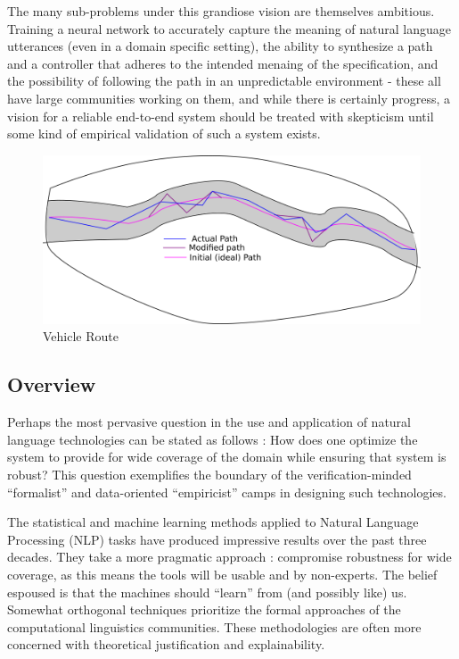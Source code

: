 \documentclass{article}
\begin{document}
The many sub-problems under this grandiose vision are themselves ambitious.
Training a neural network to accurately capture the meaning of natural language
utterances (even in a domain specific setting), the ability to synthesize a path
and a controller that adheres to the intended menaing of the specification, and
the possibility of following the path in an unpredictable environment - these
all have large communities working on them, and while there is certainly
progress, a vision for a reliable end-to-end system should be treated with
skepticism until some kind of empirical validation of such a system exists.

\begin{figure}[H]
\centering
\includegraphics[width=150mm]{pics/diagramTrial1.png}
\caption{Vehicle Route}\label{fig:A2}
\end{figure}

\subsection{Overview}

Perhaps the most pervasive question in the use and application of natural
language technologies can be stated as follows : How does one optimize the
system to provide for wide coverage of the domain while ensuring that system is
robust? This question exemplifies the boundary of the verification-minded
``formalist'' and data-oriented ``empiricist'' camps in designing such
technologies.

The statistical and machine learning methods applied to Natural Language
Processing (NLP) tasks have produced impressive results over the past three decades.
They take a more pragmatic approach : compromise robustness for wide coverage,
as this means the tools will be usable and by non-experts. The belief espoused
is that the machines should ``learn'' from (and possibly like) us. Somewhat orthogonal techniques
prioritize the formal approaches of the computational linguistics communities.
These methodologies are often more concerned with theoretical justification and
explainability.
\end{document}

